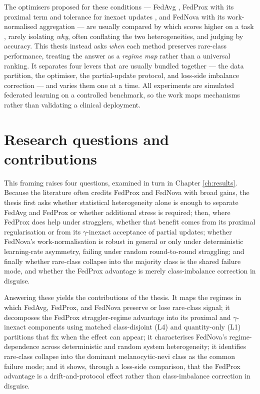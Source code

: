 \documentclass[11pt,a4paper]{report}
\begin{document}
The optimisers proposed for these conditions --- FedAvg \citep{mcmahan2017fedavg},
FedProx with its proximal term and tolerance for inexact updates
\citep{li2020fedprox}, and FedNova with its work-normalised aggregation
\citep{wang2020fednova} --- are usually compared by which scores higher on a task
\citep{li2022niidbench}, rarely isolating \emph{why}, often conflating the two
heterogeneities, and judging by accuracy. This thesis instead asks \emph{when}
each method preserves rare-class performance, treating the answer as a
\emph{regime map} rather than a universal ranking. It separates four levers that
are usually bundled together --- the data partition, the optimiser, the
partial-update protocol, and loss-side imbalance correction --- and varies them one
at a time. All experiments are simulated federated learning on a controlled
benchmark, so the work maps mechanisms rather than validating a clinical
deployment.

\section{Research questions and contributions}
\label{sec:intro-questions}

This framing raises four questions, examined in turn in
Chapter \ref{ch:results}. Because the literature often credits FedProx and
FedNova with broad gains, the thesis first asks whether statistical heterogeneity
alone is enough to separate FedAvg and FedProx or whether additional stress is
required; then, where FedProx does help under stragglers, whether that benefit
comes from its proximal regularisation or from its $\gamma$-inexact acceptance of
partial updates; whether FedNova's work-normalisation is robust in general or
only under deterministic learning-rate asymmetry, failing under random
round-to-round straggling; and finally whether rare-class collapse into the
majority class is the shared failure mode, and whether the FedProx advantage is
merely class-imbalance correction in disguise.

Answering these yields the contributions of the thesis. It maps the regimes in
which FedAvg, FedProx, and FedNova preserve or lose rare-class signal; it
decomposes the FedProx straggler-regime advantage into its proximal and
$\gamma$-inexact components using matched class-disjoint (L4) and quantity-only
(L1) partitions that fix when the effect can appear; it characterises FedNova's
regime-dependence across deterministic and random system heterogeneity; it
identifies rare-class collapse into the dominant melanocytic-nevi class as the
common failure mode; and it shows, through a loss-side comparison, that the
FedProx advantage is a drift-and-protocol effect rather than class-imbalance
correction in disguise.
\end{document}
